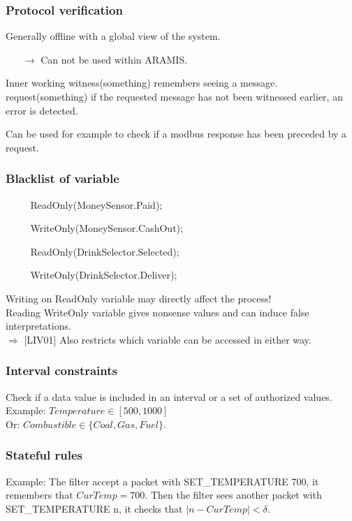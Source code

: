 \documentclass{beamer}
\begin{document}
\begin{frame}
    \frametitle{Protocol verification}

    Generally offline with a global view of the system.
    \begin{itemize}
        \item[$\rightarrow$] Can not be used within ARAMIS.
    \end{itemize}
    \vfill
    \begin{block}{Inner working}
        witness(something) remembers seeing a message.\\
        request(something) if the requested message has not been witnessed earlier, an error is detected.
    \end{block}
    \vfill
    Can be used for example to check if a modbus response has been preceded by a request.
\end{frame}

\begin{frame}
    \frametitle{Blacklist of variable}

    \begin{itemize}
        \item[~] ReadOnly(MoneySensor.Paid);
        \item[~] WriteOnly(MoneySensor.CashOut);
        \item[~] ReadOnly(DrinkSelector.Selected);
        \item[~] WriteOnly(DrinkSelector.Deliver);
    \end{itemize}
    \vfill
    Writing on ReadOnly variable may directly affect the process!\\
    Reading WriteOnly variable gives nonsense values and can induce false interpretations.\\

    $\Rightarrow$ [LIV01] Also restricts which variable can be accessed in either way.
\end{frame}

\begin{frame}
    \frametitle{Interval constraints}

    Check if a data value is included in an interval or a set of authorized values.
    \vfill
    Example: $Temperature \in [500,1000]$\\
    \vfill
    Or: $Combustible \in \{Coal, Gas, Fuel\}$.
\end{frame}

\begin{frame}
    \frametitle{Stateful rules}
    
    Example:
    \vfill
    The filter accept a packet with SET\_TEMPERATURE 700, it remembers that $CurTemp = 700$.
    \vfill
    Then the filter sees another packet with SET\_TEMPERATURE n, it checks that $|n-CurTemp| < \delta$.
\end{frame}
\end{document}
